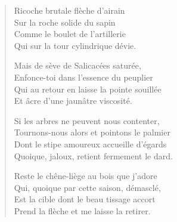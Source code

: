 \begin{verse}\quatrain%
  Ricoche brutale flèche d’airain\\  %
  Sur la roche solide du sapin\\  %
  Comme le boulet de l’artillerie\\  %
  Qui sur la tour  cylindrique dévie.\label{foot.tourRonde} 

  Mais de sève de Salicacées saturée,\\  %
  Enfonce-toi dans l’essence du peuplier\\  %
  Qui au retour en laisse la pointe souillée\\  %
  Et âcre d’une jaunâtre viscosité.

  Si les arbres ne peuvent nous contenter,\\  %
  Tournons-nous alors et pointons le palmier\\  %
  Dont le stipe amoureux accueille d’égards\\  %
  Quoique, jaloux, retient fermement le dard.

  Reste le chêne-liège au bois que j’adore\\  %
  Qui, quoique par cette saison, démasclé,\\  %
  Est la cible dont le beau tissage accort\\  %
  Prend la flèche et me laisse la retirer.    %
\end{verse}

